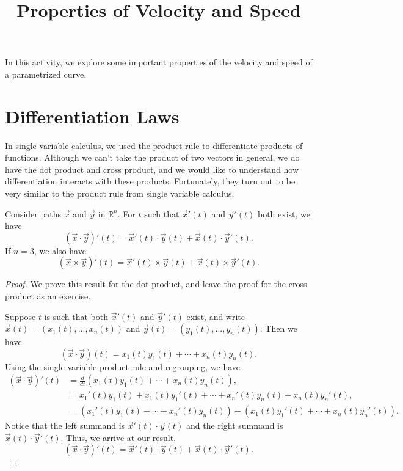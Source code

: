 \documentclass{ximera}
\title{Properties of Velocity and Speed}
\begin{document}
\begin{abstract}
\end{abstract}
\maketitle

In this activity, we explore some important properties of the velocity and speed of a parametrized curve.

\section*{Differentiation Laws}

In single variable calculus, we used the product rule to differentiate products of functions. Although we can't take the product of two vectors in general, we do have the dot product and cross product, and we would like to understand how differentiation interacts with these products. Fortunately, they turn out to be very similar to the product rule from single variable calculus. 

\begin{proposition}
Consider paths $\vec{x}$ and $\vec{y}$ in $\mathbb{R}^n$. For $t$ such that $\vec{x}'(t)$ and $\vec{y}'(t)$ both exist, we have
\[
(\vec{x}\cdot\vec{y})'(t) = \vec{x}'(t)\cdot \vec{y}(t) + \vec{x}(t)\cdot \vec{y}'(t).
\]
If $n=3$, we also have
\[
(\vec{x}\times \vec{y})'(t) = \vec{x}'(t)\times \vec{y}(t) + \vec{x}(t)\times \vec{y}'(t).
\]
\end{proposition}

\begin{proof}
We prove this result for the dot product, and leave the proof for the cross product as an exercise.

Suppose $t$ is such that both $\vec{x}'(t)$ and $\vec{y}'(t)$ exist, and write $\vec{x}(t) = (x_1(t),...,x_n(t))$ and $\vec{y}(t) = (y_1(t),...,y_n(t))$. Then we have
\[
(\vec{x}\cdot\vec{y})(t) = x_1(t)y_1(t) + \cdots + x_n(t)y_n(t).
\]
Using the single variable product rule and regrouping, we have
\begin{align*}
(\vec{x}\cdot\vec{y})'(t) & = \frac{d}{dt}\left(x_1(t)y_1(t) + \cdots + x_n(t)y_n(t)\right),\\
& = x_1'(t) y_1(t) + x_1(t)y_1'(t) +\cdots+x_n'(t) y_n(t) + x_n(t)y_n'(t),\\
& = \left(x_1'(t) y_1(t) + \cdots + x_n'(t) y_n(t)\right) + \left(x_1(t) y_1'(t) + \cdots + x_n(t) y_n'(t)\right).
\end{align*}
Notice that the left summand is $\vec{x}'(t)\cdot\vec{y}(t)$ and the right summand is $\vec{x}(t)\cdot\vec{y}'(t)$. Thus, we arrive at our result,
\[
(\vec{x}\cdot\vec{y})'(t) = \vec{x}'(t)\cdot \vec{y}(t) + \vec{x}(t)\cdot \vec{y}'(t).
\]
\end{proof}
\end{document}
